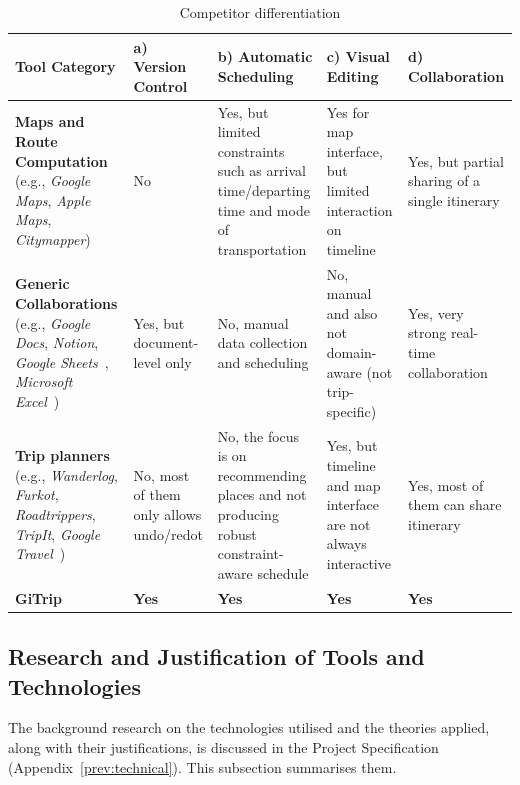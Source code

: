\begin{table}[H]
\small
\renewcommand{\arraystretch}{1.2}
\begin{tabularx}{\textwidth}{|>{\raggedright\arraybackslash}p{3cm}|>{\raggedright\arraybackslash}X|>{\raggedright\arraybackslash}X|>{\raggedright\arraybackslash}X|>{\raggedright\arraybackslash}X|}
\hline
\textbf{Tool Category} &
\textbf{a) Version Control} &
\textbf{b) Automatic Scheduling} &
\textbf{c) Visual Editing} &
\textbf{d) Collaboration} \\
\hline
\textbf{Maps and Route Computation} (e.g., \textit{Google Maps}, \textit{Apple Maps}, \textit{Citymapper}\cite{citymapper}) &
No &
Yes, but limited constraints such as arrival time/departing time and mode of transportation &
Yes for map interface, but limited interaction on timeline &
Yes, but partial sharing of a single itinerary \\
\hline
\textbf{Generic Collaborations} (e.g., \textit{Google Docs}, \textit{Notion}, \textit{Google Sheets}~\cite{google-sheets}, \textit{Microsoft Excel}~\cite{microsoft-excel}) &
Yes, but document-level only &
No, manual data collection and scheduling &
No, manual and also not domain-aware (not trip-specific) &
Yes, very strong real-time collaboration \\
\hline
\textbf{Trip planners} (e.g., \textit{Wanderlog}, \textit{Furkot}, \textit{Roadtrippers}, \textit{TripIt}, \textit{Google Travel}~\cite{google-travel}) &
No, most of them only allows undo/redot &
No, the focus is on recommending places and not producing robust constraint-aware schedule &
Yes, but timeline and map interface are not always interactive &
Yes, most of them can share itinerary \\
\hline
\textbf{GiTrip} &
\textbf{Yes} &
\textbf{Yes} &
\textbf{Yes} &
\textbf{Yes} \\
\hline
\end{tabularx}
\caption{Competitor differentiation}
\label{tab:competitor-diff}
\end{table}

\subsection{Research and Justification of Tools and Technologies}
\label{sec:tech-justification}

The background research on the technologies utilised and the theories applied, along with their justifications, is discussed in the Project Specification (Appendix~\ref{prev:technical}). This subsection summarises them.

